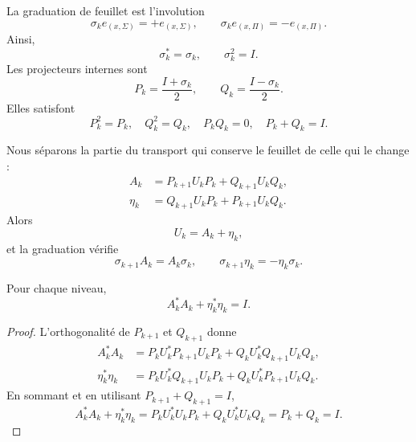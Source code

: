 La graduation de feuillet est l'involution
\begin{equation}
\label{eq:continuo-sp-sigma}
 \sigma_ke_{(x,\Sigma)}=+e_{(x,\Sigma)},
 \qquad
 \sigma_ke_{(x,\Pi)}=-e_{(x,\Pi)}.
\end{equation}
Ainsi,
\[
 \sigma_k^*=\sigma_k,
 \qquad
 \sigma_k^2=I.
\]
Les projecteurs internes sont
\begin{equation}
\label{eq:continuo-sp-p-q}
 P_k=\frac{I+\sigma_k}{2},
 \qquad
 Q_k=\frac{I-\sigma_k}{2}.
\end{equation}
Elles satisfont
\begin{equation}
\label{eq:continuo-sp-p-q-relaciones}
 P_k^2=P_k,
 \quad Q_k^2=Q_k,
 \quad P_kQ_k=0,
 \quad P_k+Q_k=I.
\end{equation}

Nous séparons la partie du transport qui conserve le feuillet de celle qui le change :
\begin{align}
 A_k&=P_{k+1}U_kP_k+Q_{k+1}U_kQ_k,
 \label{eq:continuo-sp-a}\\
 \eta_k&=Q_{k+1}U_kP_k+P_{k+1}U_kQ_k.
 \label{eq:continuo-sp-eta}
\end{align}
Alors
\begin{equation}
\label{eq:continuo-sp-u-a-eta}
 U_k=A_k+\eta_k,
\end{equation}
et la graduation vérifie
\begin{equation}
\label{eq:continuo-sp-paridad-a-eta}
 \sigma_{k+1}A_k=A_k\sigma_k,
 \qquad
 \sigma_{k+1}\eta_k=-\eta_k\sigma_k.
\end{equation}

\begin{proposition}
\label{prop:continuo-sp-balance-local}
Pour chaque niveau,
\begin{equation}
\label{eq:continuo-sp-balance-local}
 A_k^*A_k+\eta_k^*\eta_k=I.
\end{equation}
\end{proposition}

\begin{proof}
L'orthogonalité de \(P_{k+1}\) et \(Q_{k+1}\) donne
\begin{align*}
 A_k^*A_k
 &=P_kU_k^*P_{k+1}U_kP_k
   +Q_kU_k^*Q_{k+1}U_kQ_k,\\
 \eta_k^*\eta_k
 &=P_kU_k^*Q_{k+1}U_kP_k
   +Q_kU_k^*P_{k+1}U_kQ_k.
\end{align*}
En sommant et en utilisant \(P_{k+1}+Q_{k+1}=I\),
\[
 A_k^*A_k+\eta_k^*\eta_k
 =P_kU_k^*U_kP_k+Q_kU_k^*U_kQ_k
 =P_k+Q_k=I.
\]
\end{proof}

